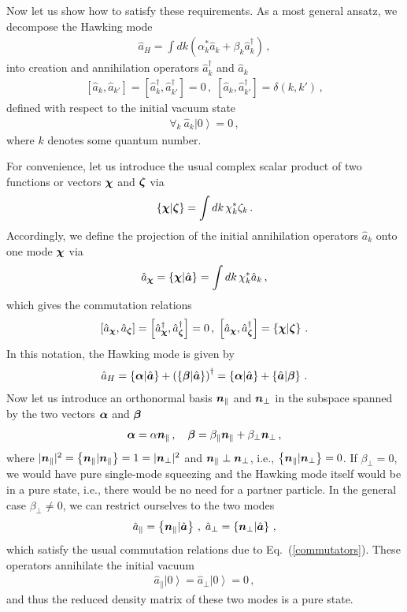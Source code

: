 \documentclass[aps,prd,showpacs,amssymb,nofootinbib,twocolumn]{revtex4}
\newcommand{\ket}[1]{\left|#1\right>}
\newcommand{\scalar}[2]{\left\{#1|#2\right\}}
\newcommand{\f}[1]{\mbox{\boldmath$#1$}}
\newcommand{\fk}[1]{\mbox{\boldmath$\scriptstyle#1$}}
\newcommand{\bea}{\begin{eqnarray}}
\newcommand{\ea}{\end{eqnarray}}
\begin{document}
Now let us show how to satisfy these requirements. 
%
As a most general ansatz, we decompose the Hawking mode 
%
\bea
\hat a_H=\int dk\left(\alpha_k^*\hat a_k+\beta_k\hat a_k^\dagger\right)
\,,
\ea
%
into creation and annihilation operators $\hat a_k^\dagger$ and $\hat a_k$ 
%
\bea
\left[\hat a_k,\hat a_{k'}\right]=
\left[\hat a_k^\dagger,\hat a_{k'}^\dagger\right]=0
\,,\;
\left[\hat a_k,\hat a_{k'}^\dagger\right]=
\delta(k,k')
\,,
\ea
%
defined with respect to the initial vacuum state 
%
\bea
\forall_k\:\hat a_k\ket{0}=0 
\,,
\ea
%
where $k$ denotes some quantum number.

For convenience, let us introduce the usual complex scalar product of 
two functions or vectors $\f{\chi}$ and $\f{\zeta}$ via 
%
\bea
\scalar{\f{\chi}}{\f{\zeta}}=\int dk\,\chi_k^* \zeta_k
\,.
\ea
%
Accordingly, we define the projection of the initial annihilation operators 
$\hat a_k$ onto one mode $\f{\chi}$ via 
%
\bea
\hat a_{\fk{\chi}}=
\scalar{\f{\chi}}{\hat{\f{a}}}=\int dk\, \chi_k^* \hat a_k
\,,
\ea
%
which gives the commutation relations 
%
\bea
\label{commutators}
\left[\hat a_{\fk{\chi}},\hat a_{\fk{\zeta}}\right]=
\left[\hat a_{\fk{\chi}}^\dagger,\hat a_{\fk{\zeta}}^\dagger\right]=0
\,,\;
\left[\hat a_{\fk{\chi}},\hat a_{\fk{\zeta}}^\dagger\right]=
\scalar{\f{\chi}}{\f{\zeta}}
\,.
\ea
%
In this notation, the Hawking mode is given by 
%
\bea
\hat a_H
=
\scalar{\f{\alpha}}{\hat{\f{a}}}+
\left(\scalar{\f{\beta}}{\hat{\f{a}}}\right)^\dagger
=
\scalar{\f{\alpha}}{\hat{\f{a}}}+
\scalar{\hat{\f{a}}}{\f{\beta}}
\,.
\ea
%
Now let us introduce an orthonormal basis $\f{n}_\|$ and $\f{n}_\perp$ 
in the subspace spanned by the two vectors $\f{\alpha}$ and $\f{\beta}$
%
\bea
\f{\alpha}=\alpha\f{n}_\|
\,,\quad
\f{\beta}=\beta_\|\f{n}_\|+\beta_\perp\f{n}_\perp 
\,,
\ea
%
where $|\f{n}_\||^2=\scalar{\f{n}_\|}{\f{n}_\|}=1=|\f{n}_\perp|^2$ and 
$\f{n}_\|\perp\f{n}_\perp$, i.e.,  $\scalar{\f{n}_\|}{\f{n}_\perp}=0$.
%
If $\beta_\perp=0$, we would have pure single-mode squeezing and 
the Hawking mode itself would be in a pure state, i.e., there would be 
no need for a partner particle. 
%
In the general case $\beta_\perp\neq0$, we can restrict ourselves 
to the two modes 
%
\bea
\hat a_\|=\scalar{\f{n}_\|}{\hat{\f{a}}}
\,,\;
\hat a_\perp=\scalar{\f{n}_\perp}{\hat{\f{a}}}
\,,
\ea
%
which satisfy the usual commutation relations due to 
Eq.~(\ref{commutators}).
%
These operators annihilate the initial vacuum 
%
\bea
\hat a_\|\ket{0}=\hat a_\perp\ket{0}=0
\,,
\ea
%
and thus the reduced density matrix of these two modes is a pure state. 
\end{document}
